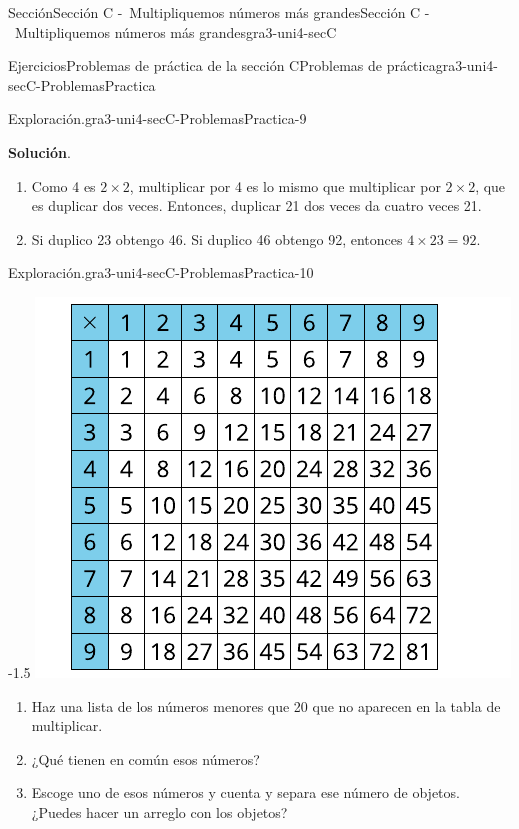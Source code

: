 \documentclass[oneside,10pt,]{article}
\newcommand{\blocktitlefont}{\relax}
\begin{document}
\begin{sectionptx}{Sección}{Sección C -~Multipliquemos números más grandes}{}{Sección C -~Multipliquemos números más grandes}{}{}{gra3-uni4-secC}
\begin{exercises-subsection}{Ejercicios}{Problemas de práctica de la sección C}{}{Problemas de práctica}{}{}{gra3-uni4-secC-ProblemasPractica}
\begin{divisionexercise}{7}{Exploración.}{}{gra3-uni4-secC-ProblemasPractica-9}
\begin{enumerate}[label={(\alph*)}]
\end{enumerate}
\par\smallskip%
\noindent\textbf{\blocktitlefont Solución}.\hypertarget{gra3-uni4-secC-ProblemasPractica-9-3}{}\quad{}%
\begin{enumerate}[label={(\alph*)}]
\item{}Como 4 es \(2 \times 2\), multiplicar por 4 es lo mismo que multiplicar por \(2 \times 2\), que es duplicar dos veces. Entonces, duplicar 21 dos veces da cuatro veces 21.%
\item{}Si duplico 23 obtengo 46. Si duplico 46 obtengo 92, entonces \(4 \times 23 = 92\).%
\end{enumerate}
\end{divisionexercise}%
\begin{divisionexercise}{8}{Exploración.}{}{gra3-uni4-secC-ProblemasPractica-10}%
\begin{image}{0}{1}{0}{-1.5\baselineskip}%
\includegraphics[width=\linewidth]{external/svg-source/tikz-file-151679-scale13.pdf}
\end{image}%
%
\begin{enumerate}[label={(\alph*)}]
\item{}Haz una lista de los números menores que 20 que no aparecen en la tabla de multiplicar.%
\item{}¿Qué tienen en común esos números?%
\item{}Escoge uno de esos números y cuenta y separa ese número de objetos. ¿Puedes hacer un arreglo con los objetos?%
\end{enumerate}

\end{divisionexercise}
\end{exercises-subsection}
\end{sectionptx}
\end{document}
